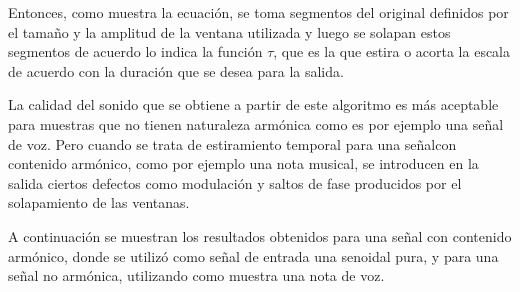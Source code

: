 \documentclass[assd_tp2_main.tex]{subfiles}
\begin{document}
Entonces, como muestra la ecuación, se toma segmentos del original definidos por el tamaño y la amplitud de la ventana utilizada y luego se solapan estos segmentos de acuerdo lo indica la función $\tau$, que es la que estira o acorta la escala de acuerdo con la duración que se desea para la salida.

La calidad del sonido que se obtiene a partir de este algoritmo es más aceptable para muestras que no tienen naturaleza armónica como es por ejemplo una señal de voz. Pero cuando se trata de estiramiento temporal para una señalcon contenido armónico, como por ejemplo una nota musical, se introducen en la salida ciertos defectos como modulación y saltos de fase producidos por el solapamiento de las ventanas.

A continuación se muestran los resultados obtenidos para una señal con contenido armónico, donde se utilizó como señal de entrada una senoidal pura, y para una señal no armónica, utilizando como muestra una nota de voz.
\end{document}
